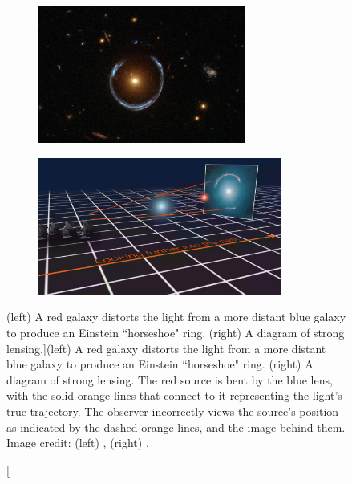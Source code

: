 \begin{figure}
 \centering
 \begin{subfigure}[t]{0.5\textwidth}
  \centering
  \includegraphics[trim={0cm, 2cm, 0cm, 0cm}, clip, height=4.5cm]{lensing_horseshoe}
 \end{subfigure}%
 \begin{subfigure}[t]{0.5\textwidth}
  \centering
  \includegraphics[trim={6cm, 0cm, 0cm, 0cm}, clip, height=4.5cm]{lensing_diagram}
 \end{subfigure}
 \caption[(left) A red galaxy distorts the light from a more distant blue galaxy to produce an Einstein ``horseshoe"
 ring.  (right)
 A diagram of strong lensing.]{(left) A red galaxy distorts the light from a more distant blue galaxy to produce an Einstein ``horseshoe"
 ring.  (right)
 A diagram of strong lensing.  The red source is bent by the blue lens, with the solid orange lines that connect
 to it representing the light's true trajectory.  The observer incorrectly views the source's
 position as indicated by the dashed orange lines, and the image behind them.  Image credit: (left) , (right)
 .}
 \label{fig:lensing}
\end{figure}


